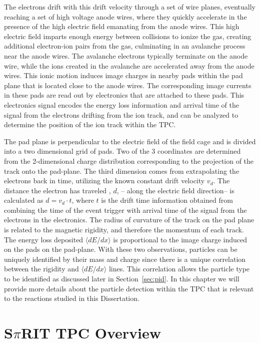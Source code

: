 The electrons drift with this drift velocity through a set of wire planes, eventually reaching a set of high voltage anode wires, where they quickly accelerate in the presence of the high electric field emanating from the anode wires. This high electric field imparts enough energy between collisions to ionize the gas, creating additional electron-ion pairs from the gas, culminating in an avalanche process near the anode wires. The avalanche electrons typically terminate on the anode wire,  while the ions created in the avalanche are accelerated  away from the anode wires. This ionic motion induces image charges in nearby pads within the pad plane that is located close to the anode wires. The corresponding image currents in these pads are read out by electronics that are attached to these pads. This electronics signal encodes the energy loss information and arrival time of the signal from the electrons drifting from the ion track, and can be analyzed to determine the position of the ion track within the TPC. 

The pad plane is perpendicular to the electric field of the field cage and is divided into a two dimensional grid of pads. Two of the 3 coordinates are determined from the 2-dimensional charge distribution corresponding to the projection of the track onto the pad-plane. The third dimension comes from extrapolating the electrons back in time, utilizing the known constant drift velocity $v_d$. The distance the electron has traveled , $d$, -- along the electric field direction-- is calculated as $d = v_d \cdot t$, where $t$ is the drift time information obtained from combining the time of the event trigger with arrival time of the signal from the  electrons in the electronics. The radius of curvature of the track on the pad plane is related to the magnetic rigidity, and therefore the momentum of each track. The energy loss deposited $\langle dE/dx\rangle$ is proportional to the image charge induced on the pads on the pad-plane. With these two observations, particles can be uniquely identified by their mass and charge since there is a unique correlation between the rigidity and $\langle dE/dx\rangle$  lines. This correlation allows the particle type to be identified as discussed later in Section~\ref{sec:pid}. In this chapter we will provide more details about the particle detection within the \spirit TPC  that is relevant to the reactions studied in this Dissertation. 


\section{S$\pi$RIT TPC Overview}

